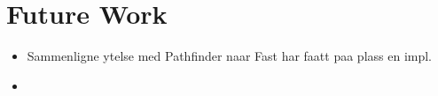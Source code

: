\chapter{Future Work}
\label{chapter:future}
\begin{itemize}	
  \item Sammenligne ytelse med Pathfinder naar Fast har faatt paa plass en impl.
  \item 
\end{itemize}

